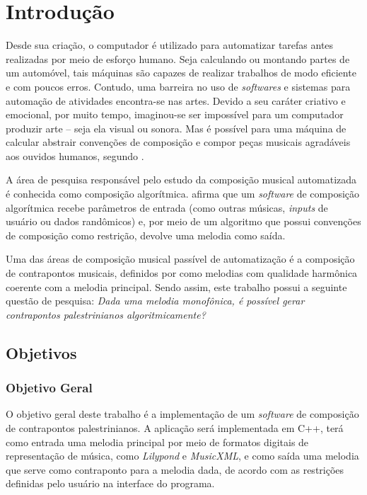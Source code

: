 \chapter*[Introdução]{Introdução}

  Desde sua criação, o computador é utilizado para automatizar tarefas antes realizadas por meio de esforço humano. Seja calculando ou montando partes de um automóvel, tais máquinas são capazes de realizar trabalhos de modo eficiente e com poucos erros. Contudo, uma barreira no uso de \textit{softwares} e sistemas para automação de atividades encontra-se nas artes. Devido a seu caráter criativo e emocional, por muito tempo, imaginou-se ser impossível para um computador produzir arte -- seja ela visual ou sonora. Mas é possível para uma máquina de calcular abstrair convenções de composição e compor peças musicais agradáveis aos ouvidos humanos, segundo .

  A área de pesquisa responsável pelo estudo da composição musical automatizada é conhecida como composição algorítmica.  afirma que um \textit{software} de composição algorítmica recebe parâmetros de entrada (como outras músicas, \textit{inputs} de usuário ou dados randômicos) e, por meio de um algoritmo que possui convenções de composição como restrição, devolve uma melodia como saída.

  Uma das áreas de composição musical passível de automatização é a composição de contrapontos musicais, definidos por  como melodias com qualidade harmônica coerente com a melodia principal. Sendo assim, este trabalho possui a seguinte questão de pesquisa: \textit{Dada uma melodia monofônica, é possível gerar contrapontos palestrinianos algoritmicamente?}

  \section*{Objetivos}

    \subsection*{Objetivo Geral}

      O objetivo geral deste trabalho é a implementação de um \textit{software} de composição de contrapontos palestrinianos. A aplicação será implementada em C++, terá como entrada uma melodia principal por meio de formatos digitais de representação de música, como \textit{Lilypond}\footnotemark {} e \textit{MusicXML}\footnotemark {}, e como saída uma melodia que serve como contraponto para a melodia dada, de acordo com as restrições definidas pelo usuário na interface do programa.



